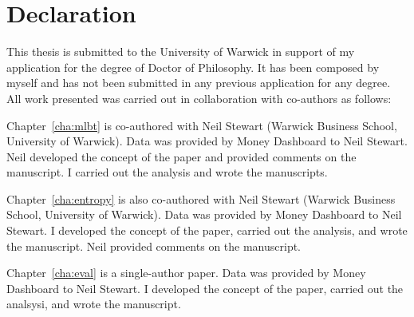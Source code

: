 
\chapter*{Declaration}%
\label{cha:declaration}

This thesis is submitted to the University of Warwick in support of my
application for the degree of Doctor of Philosophy. It has been composed by
myself and has not been submitted in any previous application for any degree.
All work presented was carried out in collaboration with co-authors as
follows:

Chapter~\ref{cha:mlbt} is co-authored with Neil Stewart (Warwick Business
School, University of Warwick). Data was provided by Money Dashboard to Neil
Stewart. Neil developed the concept of the paper and provided comments on the
manuscript. I carried out the analysis and wrote the manuscripts.

Chapter~\ref{cha:entropy} is also co-authored with Neil Stewart (Warwick
Business School, University of Warwick). Data was provided by Money Dashboard
to Neil Stewart. I developed the concept of the paper, carried out the
analysis, and wrote the manuscript. Neil provided comments on the manuscript.

Chapter~\ref{cha:eval} is a single-author paper. Data was provided by Money
Dashboard to Neil Stewart. I developed the concept of the paper, carried out
the analsysi, and wrote the manuscript.

